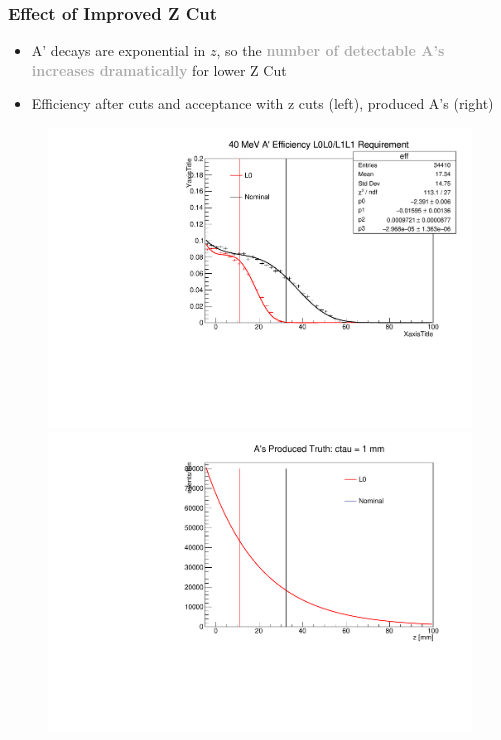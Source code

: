 \documentclass{beamer}
\begin{document}
\begin{frame}
\frametitle{Effect of Improved Z Cut}
\begin{itemize}
\item A' decays are exponential in $z$, so the \textcolor{darkgray}{\textbf{number of detectable A's increases dramatically}} for lower Z Cut
\item Efficiency after cuts and acceptance with z cuts (left), produced A's (right)
\end{itemize}
\begin{figure}
\includegraphics[width=0.55\linewidth]{figs/eff_40.pdf}
\includegraphics[width=0.55\linewidth]{figs/ap_produced.pdf}
\end{figure}

\end{frame}

\end{document}
